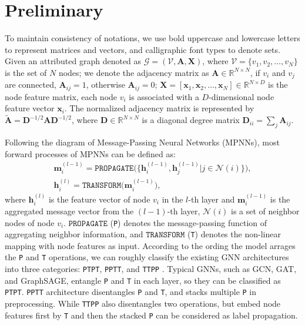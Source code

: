 \section{Preliminary}

 To maintain consistency of notations, we use bold uppercase and lowercase letters to represent matrices and vectors, and calligraphic font types to denote sets. Given an attributed graph denoted as $\mathcal{G}=(\mathcal{V},\mathbf{A}, \mathbf{X})$, where $\mathcal{V}=\{v_1,v_2,\ldots,v_N\}$ is the set of $N$ nodes; we denote the adjacency matrix as $\mathbf{A}\in\mathbb{R}^{N\times N}$, if $v_i$ and $v_j$ are connected, $\mathbf{A}_{ij}=1$, otherwise $\mathbf{A}_{ij}=0$; $\mathbf{X}=[\mathbf{x}_1,\mathbf{x}_2,\ldots,\mathbf{x}_N]\in\mathbb{R}^{N\times D}$ is the node feature matrix, each node $v_i$ is associated with a $D$-dimensional node feature vector $\mathbf{x}_i$. The normalized adjacency matrix is represented by $\tilde{\mathbf{A}}=\mathbf{D}^{-1/2}\mathbf{A}\mathbf{D}^{-1/2}$, where $\mathbf{D}\in\mathbb{R}^{N\times N}$ is a diagonal degree matrix $\mathbf{D}_{ii}=\sum_j\mathbf{A}_{ij}$.

 Following the diagram of Message-Passing Neural Networks (MPNNs), most forward processes of MPNNs can be defined as:
\begin{gather}
    \mathbf{m}_i^{(l-1)}=\texttt{PROPAGATE}\big(\big\{\mathbf{h}_i^{(l-1)},\mathbf{h}_j^{(l-1)}|j\in\mathcal{N}(i)\big\}\big),\\
    \mathbf{h}_i^{(l)}=\texttt{TRANSFORM}\big(\mathbf{m}_i^{(l-1)}\big),
\end{gather}
where $\mathbf{h}_i^{(l)}$ is the feature vector of node $v_i$ in the $l$-th layer and $\mathbf{m}_i^{(l-1)}$ is the aggregated message vector from the $(l-1)$-th layer, $\mathcal{N}(i)$ is a set of neighbor nodes of node $v_i$. $\texttt{PROPAGATE}$ (\texttt{P}) denotes the message-passing function of aggregating neighbor information, and $\texttt{TRANSFORM}$ (\texttt{T}) denotes the non-linear mapping with node features as input. 
According to the ording the model arrages the \texttt{P} and \texttt{T} operations, we can roughly classify the existing GNN architectures into three categories: \texttt{PTPT}, \texttt{PPTT}, and \texttt{TTPP} \cite{zhang2022model}. Typical GNNs, such as GCN, GAT, and GraphSAGE, entangle \texttt{P} and \texttt{T} in each layer, so they can be classified as \texttt{PTPT}. \texttt{PPTT} architecture disentangles \texttt{P} and \texttt{T}, and stacks multiple \texttt{P} in preprocessing. While \texttt{TTPP} also disentangles two operations, but embed node features first by \texttt{T} and then the stacked \texttt{P} can be considered as label propagation.

